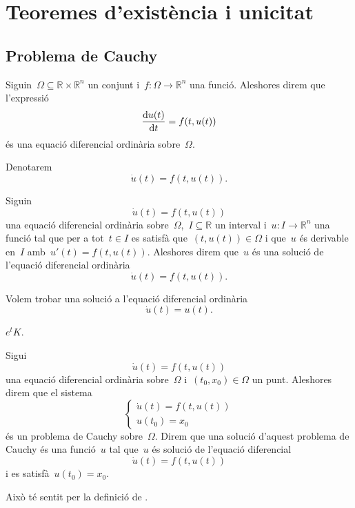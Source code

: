 \documentclass[../../Main.tex]{subfiles}
\begin{document}
\section{Teoremes d'existència i unicitat}
	\subsection{Problema de Cauchy}
	\begin{definition}
		\label{def:equació diferencial ordinària}
		Siguin~\(\Omega\subseteq\mathbb{R}\times\mathbb{R}^{n}\) un conjunt i~\(f\colon\Omega\longrightarrow\mathbb{R}^{n}\) una funció.
		Aleshores direm que l'expressió
		\[
		    \frac{\mathop{}\!\mathrm{d} u(t)}{\mathop{}\!\mathrm{d} t}=f(t,u(t))
		\]
		és una equació diferencial ordinària sobre~\(\Omega\).

		Denotarem
		\[
		    \dot{u}(t)=f(t,u(t)).
		\]
	\end{definition}
	\begin{definition}
		\label{def:solució d'una equació diferencial ordinària}
		Siguin
		\[
		    \dot{u}(t)=f(t,u(t))
		\]
		una equació diferencial ordinària sobre~\(\Omega\),~\(I\subseteq\mathbb{R}\) un interval i~\(u\colon I\longrightarrow\mathbb{R}^{n}\) una funció tal que per a tot~\(t\in I\) es satisfà que~\((t,u(t))\in\Omega\) i que~\(u\) és derivable en~\(I\) amb~\(u'(t)=f(t,u(t))\).
		Aleshores direm que~\(u\) és una solució de l'equació diferencial ordinària
		\[
		    \dot{u}(t)=f(t,u(t)).
		\]
	\end{definition}
	\begin{example}
		\label{ex:exemple d'una equació diferencial 1}
		\label{ex:exemple edos de la exponencial}
		Volem trobar una solució a l'equació diferencial ordinària
		\[
		    \dot{u}(t)=u(t).
		\]
		\begin{solution}
			\(e^{t}K\).
		\end{solution}
	\end{example}
	\begin{definition}
		\label{def:problema de Cauchy}
		\label{def:solució d'un problema de Cauchy}
		Sigui
		\[
		    \dot{u}(t)=f(t,u(t))
		\]
		una equació diferencial ordinària sobre~\(\Omega\) i~\((t_{0},x_{0})\in\Omega\) un punt.
		Aleshores direm que el sistema
		\[\begin{cases*}
			\displaystyle \dot{u}(t)=f(t,u(t)) \\
			\displaystyle u(t_{0})=x_{0}
		\end{cases*}\]
		és un problema de Cauchy sobre~\(\Omega\).
		Direm que una solució d'aquest problema de Cauchy és una funció~\(u\) tal que~\(u\) és solució de l'equació diferencial
		\[
		    \dot{u}(t)=f(t,u(t))
		\]
		i es satisfà~\(u(t_{0})=x_{0}\).

		Això té sentit per la definició de .
	\end{definition}
\end{document}
